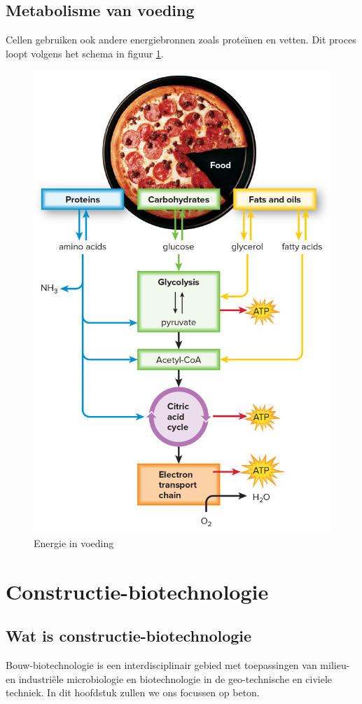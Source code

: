 \documentclass[a4paper,kul]{kulakarticle} %
\begin{document}
\subsection{Metabolisme van voeding}
Cellen gebruiken ook andere energiebronnen zoals proteïnen en vetten. Dit proces loopt volgens het schema in figuur \ref{fig:energieinvoeding}.
\begin{figure}[h]
	\centering
	\includegraphics[width=0.7\linewidth]{EnergieInVoeding}
	\caption[Energie in voeding]{Energie in voeding}
	\label{fig:energieinvoeding}
\end{figure}
\newpage
\section{Constructie-biotechnologie}
\subsection{Wat is constructie-biotechnologie}
Bouw-biotechnologie is een interdisciplinair gebied met toepassingen van milieu- en industriële microbiologie en biotechnologie in de geo-technische en civiele techniek. In dit hoofdstuk zullen we ons focussen op beton.
\end{document}
